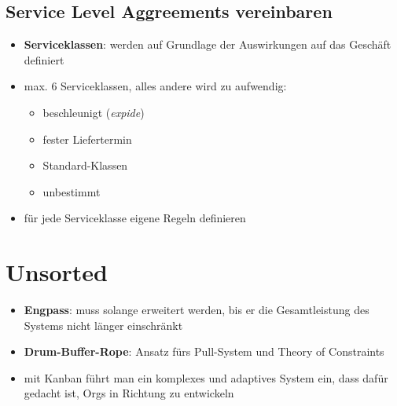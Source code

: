 \subsection{Service Level Aggreements vereinbaren}
\begin{itemize}
  \item \textbf{Serviceklassen}: werden auf Grundlage der Auswirkungen auf das Geschäft definiert
  \item max. 6 Serviceklassen, alles andere wird zu aufwendig:
    \begin{itemize}
      \item beschleunigt (\textit{expide})
      \item fester Liefertermin
      \item Standard-Klassen
      \item unbestimmt
    \end{itemize}
  \item für jede Serviceklasse eigene Regeln definieren
\end{itemize}

\section{Unsorted}
\begin{itemize}
  \item \textbf{Engpass}: muss solange erweitert werden, bis er die Gesamtleistung des Systems nicht
    länger einschränkt
  \item \textbf{Drum-Buffer-Rope}: Ansatz fürs Pull-System und Theory of Constraints
  \item mit Kanban führt man ein komplexes und adaptives System ein, dass dafür gedacht ist, Orgs in
    Richtung  zu entwickeln
\end{itemize}




